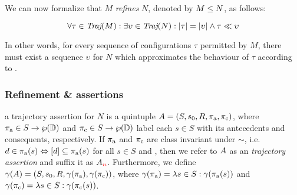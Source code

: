 

We can now formalize that $M$ \textit{refines} $N$, denoted by $M \leq N$, as follows:

\begin{equation*}
\forall \tau \in \operatorname{\textit{Traj}}(M) : \exists \upsilon \in \operatorname{\textit{Traj}}(N) : | \tau | = | \upsilon | \wedge \tau \ll \upsilon
\end{equation*}

\noindent In other words, for every sequence of configurations $\tau$ permitted by $M$, there must exist a sequence $\upsilon$ for $N$ which approximates the behaviour of $\tau$ according to . 

\subsubsection{Refinement \& assertions}

 a trajectory assertion for $N$ is a quintuple $A = (S, s_{0}, R, \operatorname{\pi_{\textrm{a}}}, \operatorname{\pi_{\textrm{c}}})$, where $\operatorname{\pi_{\textrm{a}}} \in S \rightarrow \wp(\mathbb{D})$ and $\operatorname{\pi_{\textrm{c}}} \in S \rightarrow \wp(\mathbb{D})$ label each $s \in S$ with its antecedents and consequents, respectively. If $\operatorname{\pi_{\textrm{a}}}$ and $\operatorname{\pi_{\textrm{c}}}$ are class invariant under $\sim$, i.e. $d \in \operatorname{\pi_{\textrm{a}}}(s) \Leftrightarrow [d] \subseteq \operatorname{\pi_{\textrm{a}}}(s)$ for all $s \in S$ and , then we refer to $A$ as an \textit{ trajectory assertion} and suffix it as $A_{\textcolor{red}{n}}$. Furthermore, we define $\gamma(A) = (S, s_{0}, R, \gamma(\operatorname{\pi_{\textrm{a}}}), \gamma(\operatorname{\pi_{\textrm{c}}}))$, where $\gamma(\operatorname{\pi_{\textrm{a}}}) = \lambda s \in S : \gamma(\operatorname{\pi_{\textrm{a}}}(s))$ and $\gamma(\operatorname{\pi_{\textrm{c}}}) = \lambda s \in S : \gamma(\operatorname{\pi_{\textrm{c}}}(s))$. 



